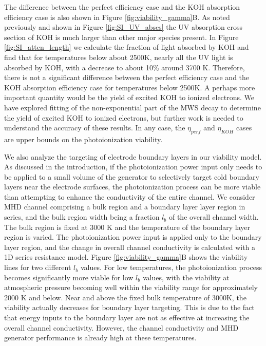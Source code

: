 The difference between the perfect efficiency case and the KOH absorption efficiency case is also shown in Figure \ref{fig:viability_gamma}B. As noted previously and shown in Figure \ref*{fig:SI_UV_abscs} the UV absorption cross section of KOH is much larger than other major species present. In Figure \ref*{fig:SI_atten_length} we calculate the fraction of light absorbed by KOH and find that for temperatures below about 2500K, nearly all the UV light is absorbed by KOH, with a decrease to about 10\% around 3700 K. Therefore, there is not a significant difference between the perfect efficiency case and the KOH absorption efficiency case for temperatures below 2500K. A perhaps more important quantity would be the yield of excited KOH to ionized electrons. We have explored fitting of the non-exponential part of the MWS decay to determine the yield of excited KOH to ionized electrons, but further work is needed to understand the accuracy of these results. In any case, the $\eta_{perf}$ and $\eta_{KOH}$ cases are upper bounds on the photoionization viability.  

We also analyze the targeting of electrode boundary layers in our viability model. As discussed in the introduction, if the photoionization power input only needs to be applied to a small volume of the generator to selectively target cold boundary layers near the electrode surfaces, the photoionization process can be more viable than attempting to enhance the conductivity of the entire channel. We consider MHD channel comprising a bulk region and a boundary layer layer region in series, and the bulk region width being a fraction $l_b$ of the overall channel width. The bulk region is fixed at 3000 K and the temperature of the boundary layer region is varied. The photoionization power input is applied only to the boundary layer region, and the change in overall channel conductivity is calculated with a 1D series resistance model. Figure \ref{fig:viability_gamma}B shows the viability lines for two different $l_b$ values. For low temperatures, the photoionization process becomes significantly more viable for low $l_b$ values, with the viability at atmospheric pressure becoming well within the viability range for approximately 2000 K and below. Near and above the fixed bulk temperature of 3000K, the viability actually decreases for boundary layer targeting. This is due to the fact that energy inputs to the boundary layer are not as effective at increasing the overall channel conductivity. However, the channel conductivity and MHD generator performance is already high at these temperatures. 


